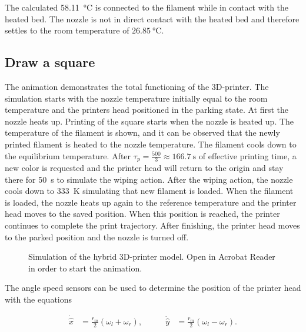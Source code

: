 \documentclass[a4paper,11pt]{article}
\begin{document}
The calculated \SI{58.11}{\degreeCelsius} is connected to the filament while in contact with the heated bed. The nozzle is not in direct contact with the heated bed and therefore settles to the room temperature of $\SI{26.85}{\degreeCelsius}$.

\subsection{Draw a square}

The animation  demonstrates the total functioning of the 3D-printer. The simulation starts with the nozzle temperature initially equal to the room temperature and the printers head positioned in the parking state. At first the nozzle heats up. Printing of the square starts when the nozzle is heated up. The temperature of the filament is shown, and it can be observed that the newly printed filament is heated to the nozzle temperature. The filament cools down to the equilibrium temperature. After $\tau_p=\frac{500}{3}\approx \SI{166.7}{\second}$ of effective printing time, a new color is requested and the printer head will return to the origin and stay there for \SI{50}{\second} to simulate the wiping action. After the wiping action, the nozzle cools down to \SI{333}{\kelvin} simulating that new filament is loaded. When the filament is loaded, the nozzle heats up again to the reference temperature and the printer head moves to the saved position. When this position is reached, the printer continues to complete the print trajectory. After finishing, the printer head moves to the parked position and the nozzle is turned off.

\begin{figure}[H]
    \centering
    \caption{Simulation of the hybrid 3D-printer model. Open in Acrobat Reader in order to start the animation.}
    \label{fig:hybrid-animation}
\end{figure}

The angle speed sensors can be used to determine the position of the printer head with the equations

\begin{equation}
\begin{aligned}
    \dot{\hat{x}} &= \frac{r_m}{2} \left(\omega_l + \omega_r\right),
    &\qquad
    \dot{\hat{y}} &= \frac{r_m}{2} \left(\omega_l - \omega_r\right).
\end{aligned}
\end{equation}
\end{document}

